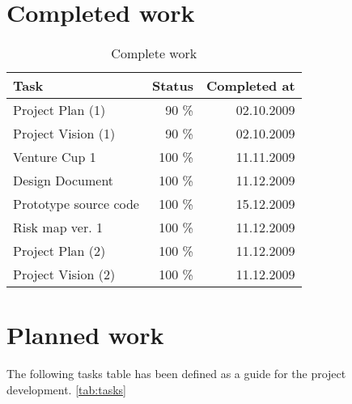 \documentclass[12pt,a4paper]{article}
\begin{document}
\section{Completed work}

\begin{table}[h!]
\small
\begin{tabular}{ l | r | r}
Task					&Status	&Completed at\\\hline\hline
Project Plan (1)			&90 \%	&02.10.2009\\
Project Vision (1)		&90 \%	&02.10.2009\\
Venture Cup 1			&100 \%	&11.11.2009\\
Design Document		&100 \%	&11.12.2009\\
Prototype source code	&100 \%	&15.12.2009\\
Risk map ver. 1			&100 \%	&11.12.2009\\
Project Plan (2)			&100 \%	&11.12.2009\\
Project Vision (2)		&100 \%	&11.12.2009\\
\end{tabular}
\caption{Complete work}
\label{tab:compwork}
\end{table}

\section{Planned work}

The following tasks table has been defined as a guide for the project development. \ref{tab:tasks}
\end{document}
